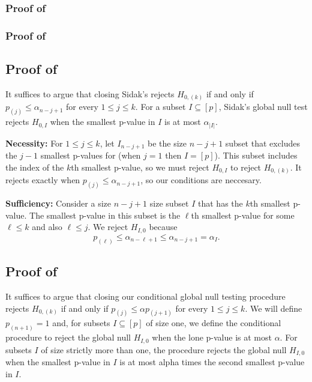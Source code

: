 \documentclass{article}
\begin{document}
\begin{appendix}
\subsubsection*{Proof of }

\subsubsection*{Proof of }

\subsection{Proof of }

It suffices to argue that closing Sidak's rejects $H_{0, (k)}$ if and only if $p_{(j)} \leq \alpha_{n - j + 1}$ for every $1 \leq j \leq k$. For a subset $I \subseteq [p]$, Sidak's global null test rejects $H_{0, I}$ when the smallest p-value in $I$ is at most $\alpha_{|I|}$. \newline 

\noindent \textbf{Necessity: } For $1 \leq j \leq k$, let $I_{n-j + 1}$ be the size $n - j + 1$ subset that excludes the $j - 1$ smallest p-values for (when $j = 1$ then $I = [p]$). This subset includes the index of the $k$th smallest p-value, so we must reject $H_{0, I}$ to reject $H_{0, (k)}$. It rejects exactly when $p_{(j)} \leq \alpha_{n - j + 1}$, so our conditions are neccesary.\newline 

\noindent \textbf{Sufficiency: } Consider a size $n - j  + 1$ size subset $I$ that has the $k$th smallest p-value. The smallest p-value in this subset is the $\ell$th smallest p-value for some $\ell \leq k$ and also $\ell \leq j$. We reject $H_{I, 0}$ because 
\begin{equation*}
    p_{(\ell)} \leq \alpha_{n - \ell + 1} \leq \alpha_{n - j + 1} = \alpha_{I}.
\end{equation*}

\subsection{Proof of }

It suffices to argue that closing our conditional global null testing procedure rejects $H_{0, (k)}$ if and only if $p_{(j)} \leq \alpha p_{(j + 1)} $ for every $1 \leq j \leq k$. We will define $p_{(n+1)} = 1$ and, for subsets $I \subseteq [p]$ of size one, we define the conditional procedure to reject the global null $H_{I, 0}$ when the lone p-value is at most $\alpha$. For subsets $I$ of size strictly more than one, the procedure rejects the global null $H_{I, 0}$ when the smallest p-value in $I$ is at most alpha times the second smallest p-value in $I$. \newline 


\end{appendix}
\end{document}
